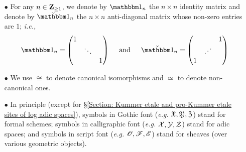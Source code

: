 \begin{enumerate}
    \item[$\bullet$] For any $n\in \operatorname{\mathbf{Z}}_{\geq 1}$, we denote by $\one_n$ the $n\times n$ identity matrix and denote by $\oneanti_n$ the $n\times n$ anti-diagonal matrix whose non-zero entries are $1$; \emph{i.e.,} $$\one_n=\begin{pmatrix} 1& & \\ & \ddots & \\ & &1\end{pmatrix}\quad\text{ and }\quad\oneanti_n=\begin{pmatrix} & & 1\\ & \iddots & \\ 1 & &\end{pmatrix}$$
    \item[$\bullet$] We use $\cong$ to denote canonical isomorphisms and $\simeq$ to denote non-canonical ones.
    \item[$\bullet$] In principle (except for \S \ref{Section: Kummer etale and pro-Kummer etale sites of log adic spaces}), symbols in Gothic font (\emph{e.g.} $\operatorname{\mathfrak{X}}, \operatorname{\mathfrak{Y}}, \operatorname{\mathfrak{Z}}$) stand for formal schemes; symbols in calligraphic font (\emph{e.g.} $\operatorname{\mathcal{X}}, \operatorname{\mathcal{Y}}, \operatorname{\mathcal{Z}}$) stand for adic spaces; and symbols in script font (\emph{e.g.} $\operatorname{\mathscr{O}}, \operatorname{\mathscr{F}}, \operatorname{\mathscr{E}}$) stand for sheaves (over various geometric objects). 
\end{enumerate}